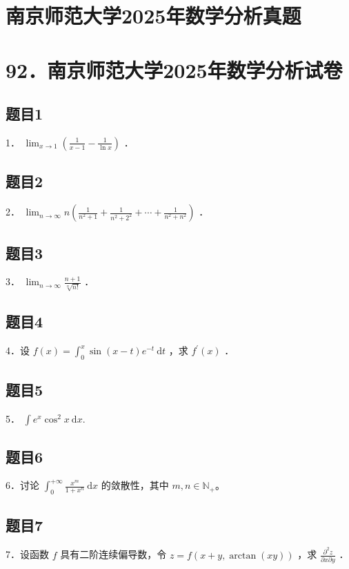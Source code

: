 \documentclass{article}
\begin{document}
\section*{南京师范大学2025年数学分析真题}
\section*{92．南京师范大学2025年数学分析试卷}

\subsection{题目1}
1． \(\lim _{x \rightarrow 1}\left(\frac{1}{x-1}-\frac{1}{\ln x}\right)\) ．

\subsection{题目2}
2． \(\lim _{n \rightarrow \infty} n\left(\frac{1}{n^{2}+1}+\frac{1}{n^{2}+2^{2}}+\cdots+\frac{1}{n^{2}+n^{2}}\right)\) ．

\subsection{题目3}
3． \(\lim _{n \rightarrow \infty} \frac{n+1}{\sqrt[n]{n!}}\) ．

\subsection{题目4}
4．设 \(f(x)=\int_{0}^{x} \sin (x-t) e^{-t} \mathrm{~d} t\) ，求 \(f^{\prime}(x)\) ．

\subsection{题目5}
5． \(\int e^{x} \cos ^{2} x \mathrm{~d} x\).

\subsection{题目6}
6．讨论 \(\int_{0}^{+\infty} \frac{x^{m}}{1+x^{n}} \mathrm{~d} x\) 的敛散性，其中 \(m, n \in \mathbb{N}_{+}\)。

\subsection{题目7}
7．设函数 \(f\) 具有二阶连续偏导数，令 \(z=f(x+y, \arctan (x y))\) ，求 \(\frac{\partial^{2} z}{\partial x \partial y}\) ．
\end{document}
